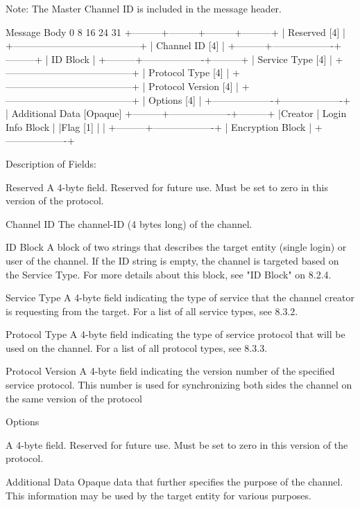 \documentclass[titlepage,oneside]{book}
\begin{document}
Note: The Master Channel ID is included in the message header.

Message Body
0         8         16        24      31
+---------+---------+---------+---------+
|               Reserved [4]            |
+---------------------------------------+
|              Channel ID [4]           |
+---------+-------------------+---------+
          |      ID Block     |
+---------+-------------------+---------+
|            Service Type [4]           |
+---------------------------------------+
|           Protocol Type [4]           |
+---------------------------------------+
|          Protocol Version [4]         |
+---------------------------------------+
|               Options [4]             |
+-------------------+-------------------+
| Additional Data [Opaque]
+---------+-------------------+---------+
|Creator  | Login Info Block  |
|Flag [1] |                   |
+---------+-------------------+
          |  Encryption Block |
          +-------------------+

Description of Fields:

Reserved
  A 4-byte field. Reserved for future use. Must be set to zero in this
  version of the protocol.

Channel ID
  The channel-ID (4 bytes long) of the channel.

ID Block
  A block of two strings that describes the target entity (single
  login) or user of the channel. If the ID string is empty, the channel
  is targeted based on the Service Type. For more details about this
  block, see "ID Block" on 8.2.4.

Service Type
  A 4-byte field indicating the type of service that the channel
  creator is requesting from the target. For a list of all service
  types, see 8.3.2.

Protocol Type
  A 4-byte field indicating the type of service protocol that will be 
  used on the channel. For a list of all protocol types, see 
  8.3.3.

Protocol Version
  A 4-byte field indicating the version number of the specified service
  protocol. This number is used for synchronizing both sides the
  channel on the same version of the protocol

Options

  A 4-byte field. Reserved for future use. Must be set to zero in this
  version of the protocol.

Additional Data
  Opaque data that further specifies the purpose of the channel. This
  information may be used by the target entity for various purposes.
\end{document}
